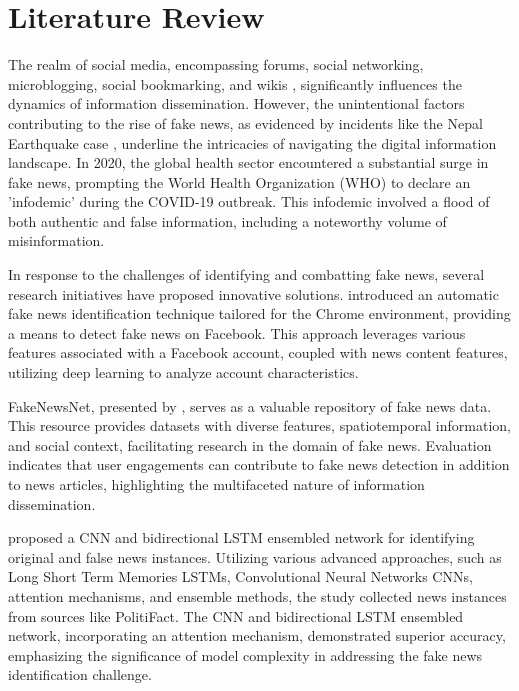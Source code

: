 \chapter{Literature Review}
\label{ch:lit_rev} %

The realm of social media, encompassing forums, social networking, microblogging, social bookmarking, and wikis \citep{esrc}\citep{gil2019}, significantly influences the dynamics of information dissemination. However, the unintentional factors contributing to the rise of fake news, as evidenced by incidents like the Nepal Earthquake case \citep{tandoc2017}\citep{radianti2016}, underline the intricacies of navigating the digital information landscape. In 2020, the global health sector encountered a substantial surge in fake news, prompting the World Health Organization (WHO) to declare an 'infodemic' during the COVID-19 outbreak. This infodemic involved a flood of both authentic and false information, including a noteworthy volume of misinformation.

In response to the challenges of identifying and combatting fake news, several research initiatives have proposed innovative solutions. \cite{sahoo2021multiple} introduced an automatic fake news identification technique tailored for the Chrome environment, providing a means to detect fake news on Facebook. This approach leverages various features associated with a Facebook account, coupled with news content features, utilizing deep learning to analyze account characteristics.

FakeNewsNet, presented by \cite{shu2020fakenewsnet}, serves as a valuable repository of fake news data. This resource provides datasets with diverse features, spatiotemporal information, and social context, facilitating research in the domain of fake news. Evaluation indicates that user engagements can contribute to fake news detection in addition to news articles, highlighting the multifaceted nature of information dissemination.

\cite{Kumar} proposed a CNN and bidirectional LSTM ensembled network for identifying original and false news instances. Utilizing various advanced approaches, such as Long Short Term Memories LSTMs, Convolutional Neural Networks CNNs, attention mechanisms, and ensemble methods, the study collected news instances from sources like PolitiFact. The CNN and bidirectional LSTM ensembled network, incorporating an attention mechanism, demonstrated superior accuracy, emphasizing the significance of model complexity in addressing the fake news identification challenge.

